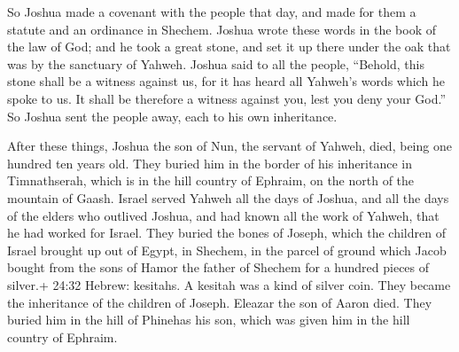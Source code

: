  So Joshua made a covenant with the people that day, and
made for them a statute and an ordinance in Shechem. 
Joshua wrote these words in the book of the law of God; and he took a
great stone, and set it up there under the oak that was by the sanctuary
of Yahweh.  Joshua said to all the people, ``Behold, this
stone shall be a witness against us, for it has heard all Yahweh's words
which he spoke to us. It shall be therefore a witness against you, lest
you deny your God.''  So Joshua sent the people away, each
to his own inheritance.

 After these things, Joshua the son of Nun, the servant of
Yahweh, died, being one hundred ten years old.  They buried
him in the border of his inheritance in Timnathserah, which is in the
hill country of Ephraim, on the north of the mountain of Gaash.
 Israel served Yahweh all the days of Joshua, and all the
days of the elders who outlived Joshua, and had known all the work of
Yahweh, that he had worked for Israel.  They buried the
bones of Joseph, which the children of Israel brought up out of Egypt,
in Shechem, in the parcel of ground which Jacob bought from the sons of
Hamor the father of Shechem for a hundred pieces of silver.+ 24:32
Hebrew: kesitahs. A kesitah was a kind of silver coin. They became the
inheritance of the children of Joseph.  Eleazar the son of
Aaron died. They buried him in the hill of Phinehas his son, which was
given him in the hill country of Ephraim.
